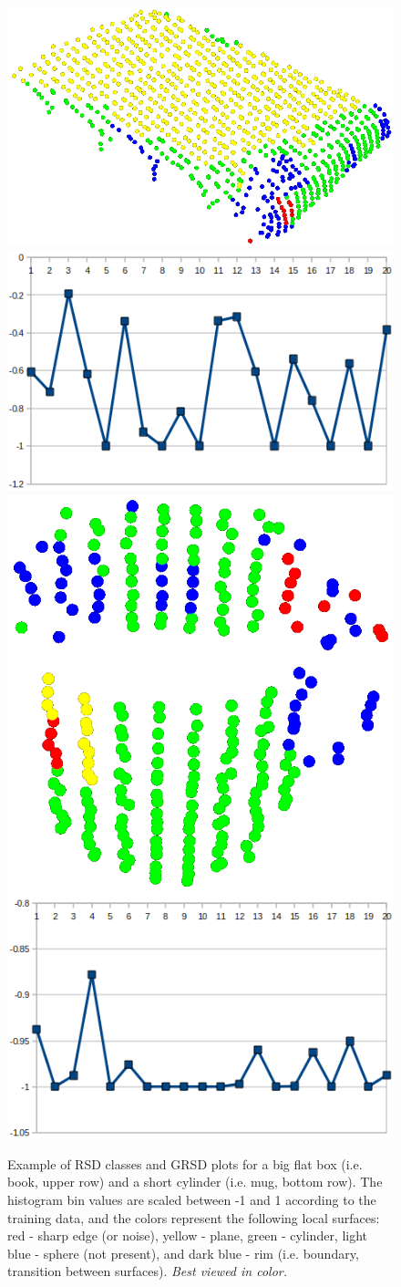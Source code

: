 \documentclass[conference]{sty/IEEEtran}
\begin{document}
\begin{figure}[htb!]
  \begin{center}
    \includegraphics[width=.4\columnwidth]{figures/grsd/book.png}
\hfill
    \includegraphics[width=.48\columnwidth]{figures/grsd/book_global.png} \\
\hfill
    \includegraphics[width=.3\columnwidth]{figures/grsd/mug.png}
\hfill
    \includegraphics[width=.48\columnwidth]{figures/grsd/mug_global.png}
\caption{Example of RSD classes and GRSD plots for a big flat box (i.e. book, upper row) and a short cylinder (i.e. mug, bottom row).
The histogram bin values are scaled between -1 and 1 according to the
training data, and the colors represent the following local surfaces:
red - sharp edge (or noise), yellow - plane, green - cylinder, light blue -
sphere (not present), and dark blue - rim (i.e. boundary, transition between surfaces).
\emph{Best viewed in color.}
}
    \label{fig:grsd}
  \end{center}
\vspace{-2ex}
\end{figure}
\end{document}
